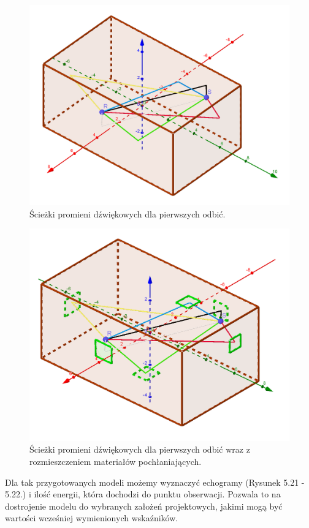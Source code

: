 \begin{figure}[h]
        \centering
                \centering
                \includegraphics[width=12cm]{1szeodbicia}
	\caption{Ścieżki promieni dźwiękowych dla pierwszych odbić.}
\end{figure}

\begin{figure}[h]
        \centering
                \centering
                \includegraphics[width=12cm]{1odbiciazpoch}
	\caption{Ścieżki promieni dźwiękowych dla pierwszych odbić wraz z rozmieszczeniem materiałów pochłaniających.}
\end{figure}

Dla tak przygotowanych modeli możemy wyznaczyć echogramy (Rysunek 5.21 - 5.22.) i ilość energii, która dochodzi do punktu obserwacji. Pozwala to na dostrojenie modelu do wybranych założeń projektowych, jakimi mogą być wartości wcześniej wymienionych wskaźników.


